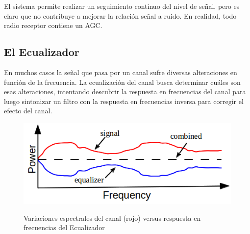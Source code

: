 El sistema permite realizar un seguimiento continuo del nivel de señal, pero es claro que no contribuye a mejorar la relación señal a ruido. En realidad, todo radio receptor contiene un AGC. \\

\subsection{El Ecualizador}

En muchos casos la señal que pasa por un canal sufre diversas alteraciones en función de la frecuencia. La ecualización del canal busca determinar cuáles son esas alteraciones, intentando descubrir la respuesta en frecuencias del canal para luego sintonizar un filtro con la respuesta en frecuencias inversa para corregir el efecto del canal.

\vspace{200px}
\begin{figure}[h!]
	\captionsetup{justification = raggedright, singlelinecheck = false}
	\caption{Variaciones espectrales del canal (rojo) versus respuesta en frecuencias del Ecualizador} 
	\centering
	\includegraphics[scale=1]{Imagenes/Inversa.png}
	\label{fig:Inversa}
\end{figure}

